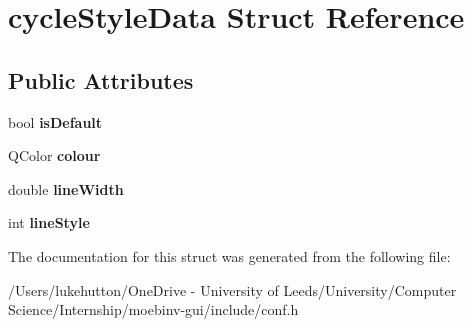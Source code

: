 \hypertarget{structcycle_style_data}{}\section{cycle\+Style\+Data Struct Reference}
\label{structcycle_style_data}
\subsection*{Public Attributes}
\begin{DoxyCompactItemize}
\item 
\mbox{\label{structcycle_style_data_a2f0a7ba93c9cb8104399a0357f98507d}} 
bool {\bfseries is\+Default}
\item 
\mbox{\label{structcycle_style_data_a77370c35742330617cccebfb0774edcd}} 
Q\+Color {\bfseries colour}
\item 
\mbox{\label{structcycle_style_data_a65843c85926f1ae36e123789026bb09b}} 
double {\bfseries line\+Width}
\item 
\mbox{\label{structcycle_style_data_a3ff1e430f3bb40585365c496c1702f92}} 
int {\bfseries line\+Style}
\end{DoxyCompactItemize}


The documentation for this struct was generated from the following file\+:\begin{DoxyCompactItemize}
\item 
/\+Users/lukehutton/\+One\+Drive -\/ University of Leeds/\+University/\+Computer Science/\+Internship/moebinv-\/gui/include/conf.\+h\end{DoxyCompactItemize}
